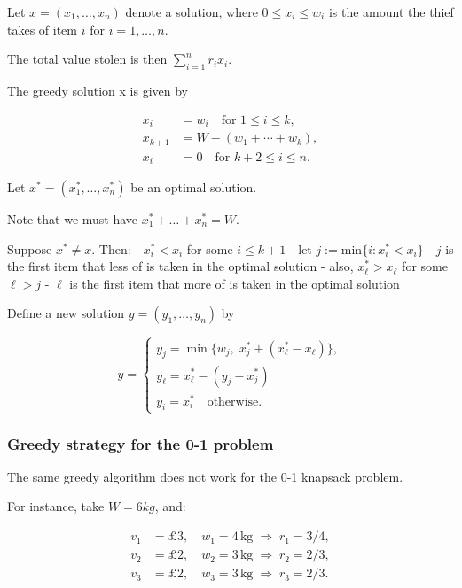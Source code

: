 \documentclass[11pt]{article}
\begin{document}
Let \(x = (x_1, \ldots , x_n)\) denote a solution, where
\(0 \leq x_i \leq w_i\) is the amount the thief takes of item \(i\) for
\(i = 1, \ldots , n\).

The total value stolen is then \(\sum_{i=1}^n r_i x_i\).

The greedy solution x is given by

\[
\begin{aligned}
x_i &= w_i \quad \text{for } 1 \le i \le k,\\
x_{k+1} &= W - (w_1 + \cdots + w_k),\\
x_i &= 0 \quad \text{for } k+2 \le i \le n.
\end{aligned}
\]

Let \(x^* = (x_1^*, \ldots , x_n^*)\) be an optimal solution.

Note that we must have \(x_1^* + \ldots + x_n^*= W\).

Suppose \(x^* \neq x\). Then: - \(x_i^* < x_i\) for some
\(i \leq k + 1\) - let \(j := \text{min}\{i : x_i^* < x_i\}\) - \(j\) is
the first item that less of is taken in the optimal solution - also,
\(x_\ell^* > x_\ell\) for some \(\ell > j\) - \(\ell\) is the first item
that more of is taken in the optimal solution

Define a new solution \(y = (y_1, \dots, y_n)\) by

\[
y =
\begin{cases}
y_j = \min \big\{ w_j, \; x_j^* + (x_\ell^* - x_\ell) \big\}, \\
y_\ell = x_\ell^* - (y_j - x_j^*) \\
y_i = x_i^* \quad \text{otherwise}.
\end{cases}
\]

    \subsubsection{Greedy strategy for the 0-1
problem}\label{greedy-strategy-for-the-0-1-problem}

The same greedy algorithm does not work for the 0-1 knapsack problem.

For instance, take \(W = 6kg\), and:

\[
\begin{aligned}
v_1 &= \pounds{}3, \quad w_1 = 4\,\text{kg} \;\Rightarrow\; r_1 = 3/4,\\
v_2 &= \pounds{}2, \quad w_2 = 3\,\text{kg} \;\Rightarrow\; r_2 = 2/3,\\
v_3 &= \pounds{}2, \quad w_3 = 3\,\text{kg} \;\Rightarrow\; r_3 = 2/3.
\end{aligned}
\]
\end{document}
